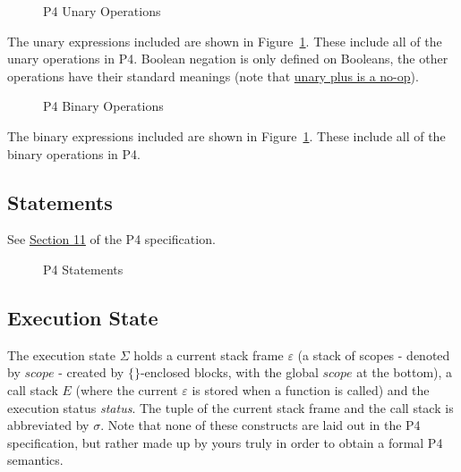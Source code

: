 \documentclass[UTF8]{article}
\begin{document}
\begin{figure}[ht!]
\centering\ottgrammartabular{
\ottunop\ottafterlastrule
}
\caption{P4 Unary Operations}
\label{fig:unop}
\end{figure}

The unary expressions included are shown in Figure~\ref{fig:unop}. These include all of the unary operations in P4. Boolean negation is only defined on Booleans, the other operations have their standard meanings (note that \href{https://p4.org/p4-spec/docs/P4-16-v1.2.1.html#sec-bit-ops}{unary plus is a no-op}).

\newpage
\begin{figure}[h!]
\centering\ottgrammartabular{
\ottbinop\ottafterlastrule
}
\caption{P4 Binary Operations}
\label{fig:binop}
\end{figure}

The binary expressions included are shown in Figure~\ref{fig:unop}. These include all of the binary operations in P4.

\newpage
\subsection{Statements}
\newcommand{\stmt}{\textit{stmt}}
\label{ssec:stmt}
See \href{https://p4.org/p4-spec/docs/P4-16-v1.2.1.html#sec-stmts}{Section 11} of the P4 specification.

\begin{figure}[h!]
\centering\ottgrammartabular{
\ottstmt\ottafterlastrule
}
\caption{P4 Statements}
\label{fig:stmt}
\end{figure}

\newpage
\newcommand{\state}{\Sigma}
\newcommand{\scope}{\ensuremath{\mathit{scope}}}
\newcommand{\stacks}{\sigma}
\newcommand{\currsf}{\ensuremath{\varepsilon}}
\newcommand{\gscope}{\ensuremath{\currsf [0] }}
\newcommand{\cstack}{E}
\newcommand{\status}{\textit{status}}
\subsection{Execution State}
The execution state $\state{}$ holds a current stack frame $\currsf$ (a stack of scopes - denoted by \scope{} - created by $\{ \}$-enclosed blocks, with the global \scope{} at the bottom), a call stack $\cstack$ (where the current \currsf{} is stored when a function is called) and the execution status \status{}. The tuple of the current stack frame and the call stack is abbreviated by $\stacks{}$. Note that none of these constructs are laid out in the P4 specification, but rather made up by yours truly in order to obtain a formal P4 semantics.
\end{document}
